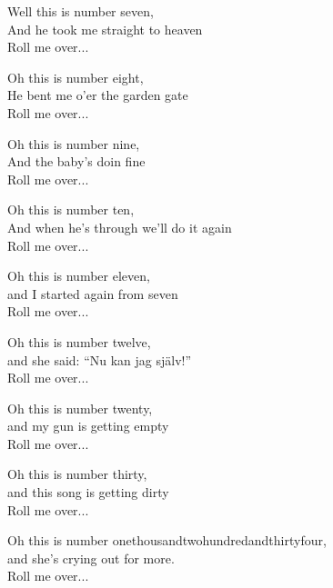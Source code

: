 {Well this is number seven,\\
And he took me straight to heaven\\
Roll me over...\par
\vspace{7pt}
Oh this is number eight,\\
He bent me o'er the garden gate\\
Roll me over...\par
\vspace{7pt}
Oh this is number nine,\\
And the baby's doin fine\\
Roll me over...\par
\vspace{7pt}
Oh this is number ten,\\
And when he's through we'll do it again\\
Roll me over...\par
\vspace{7pt}
Oh this is number eleven,\\
and I started again from seven\\
Roll me over...\par
\vspace{7pt}
Oh this is number twelve,\\
and she said: ``Nu kan jag själv!''\\
Roll me over...\par
\vspace{7pt}
Oh this is number twenty,\\
and my gun is getting empty\\
Roll me over...\par
\vspace{7pt}
Oh this is number thirty,\\
and this song is getting dirty\\
Roll me over...\par
\vspace{7pt}
Oh this is number onethousandtwohundredandthirtyfour,\\
and she's crying out for more.\\
Roll me over...}
\vspace*{-10pt}
